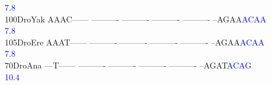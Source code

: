 \documentclass[11pt,twoside,reqno,a4paper]{article}
\begin{document}
{\hspace*{4\charwidth}\hspace*{7\charwidth}\hspace*{1\charwidth}\hspace*{1\charwidth}\hspace*{1\charwidth}\hspace*{1\charwidth}\hspace*{1\charwidth}\hspace*{56\charwidth}\textcolor{Blue}{7.8}\hspace*{1\charwidth}\\
100\hspace*{1\charwidth}DroYak	AAAC------	----------	----------	----------	----------	--AGAA\textcolor{Blue}{A}\textcolor{Blue}{C}\textcolor{Blue}{A}\textcolor{Blue}{A}	\\
\hspace*{4\charwidth}\hspace*{7\charwidth}\hspace*{1\charwidth}\hspace*{1\charwidth}\hspace*{1\charwidth}\hspace*{1\charwidth}\hspace*{1\charwidth}\hspace*{56\charwidth}\textcolor{Blue}{7.8}\hspace*{1\charwidth}\\
105\hspace*{1\charwidth}DroEre	AAAT------	----------	----------	----------	----------	--AGAA\textcolor{Blue}{A}\textcolor{Blue}{C}\textcolor{Blue}{A}\textcolor{Blue}{A}	\\
\hspace*{4\charwidth}\hspace*{7\charwidth}\hspace*{1\charwidth}\hspace*{1\charwidth}\hspace*{1\charwidth}\hspace*{1\charwidth}\hspace*{1\charwidth}\hspace*{56\charwidth}\textcolor{Blue}{7.8}\hspace*{1\charwidth}\\
70\hspace*{2\charwidth}DroAna	---T------	----------	----------	----------	----------	--AGAT\textcolor{Blue}{A}\textcolor{Blue}{C}\textcolor{Blue}{A}\textcolor{Blue}{G}	\\
\hspace*{4\charwidth}\hspace*{7\charwidth}\hspace*{1\charwidth}\hspace*{1\charwidth}\hspace*{1\charwidth}\hspace*{1\charwidth}\hspace*{1\charwidth}\hspace*{56\charwidth}\textcolor{Blue}{10.4}\hspace*{1\charwidth}\\
}
\end{document}
